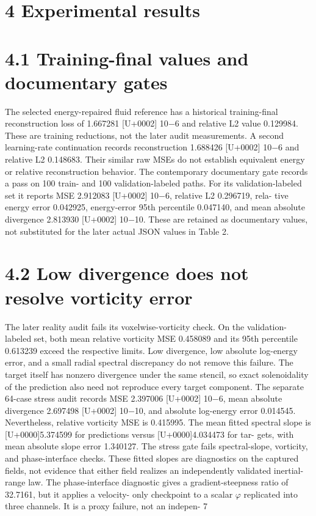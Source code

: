 \documentclass[11pt]{article}
\begin{document}
\section*{4 Experimental results}


\section*{4.1 Training-final values and documentary gates}

The selected energy-repaired fluid reference has a historical training-final reconstruction loss of
1.667281 [U+0002] 10\ensuremath{-}6 and relative L2 value 0.129984. These are training reductions, not the later
audit measurements. A second learning-rate continuation records reconstruction 1.688426 [U+0002] 10\ensuremath{-}6
and relative L2 0.148683. Their similar raw MSEs do not establish equivalent energy or relative
reconstruction behavior.
The contemporary documentary gate records a pass on 100 train- and 100 validation-labeled
paths. For its validation-labeled set it reports MSE 2.912083 [U+0002] 10\ensuremath{-}6, relative L2 0.296719, rela-
tive energy error 0.042925, energy-error 95th percentile 0.047140, and mean absolute divergence
2.813930 [U+0002] 10\ensuremath{-}10. These are retained as documentary values, not substituted for the later actual
JSON values in Table 2.

\section*{4.2 Low divergence does not resolve vorticity error}

The later reality audit fails its voxelwise-vorticity check. On the validation-labeled set, both mean
relative vorticity MSE 0.458089 and its 95th percentile 0.613239 exceed the respective limits. Low
divergence, low absolute log-energy error, and a small radial spectral discrepancy do not remove
this failure. The target itself has nonzero divergence under the same stencil, so exact solenoidality
of the prediction also need not reproduce every target component.
The separate 64-case stress audit records MSE 2.397006 [U+0002] 10\ensuremath{-}6, mean absolute divergence
2.697498 [U+0002] 10\ensuremath{-}10, and absolute log-energy error 0.014545. Nevertheless, relative vorticity MSE
is 0.415995. The mean fitted spectral slope is [U+0000]5.374599 for predictions versus [U+0000]4.034473 for tar-
gets, with mean absolute slope error 1.340127. The stress gate fails spectral-slope, vorticity, and
phase-interface checks. These fitted slopes are diagnostics on the captured fields, not evidence that
either field realizes an independently validated inertial-range law.
The phase-interface diagnostic gives a gradient-steepness ratio of 32.7161, but it applies a velocity-
only checkpoint to a scalar \ensuremath{\varphi} replicated into three channels. It is a proxy failure, not an indepen-
7
\end{document}
